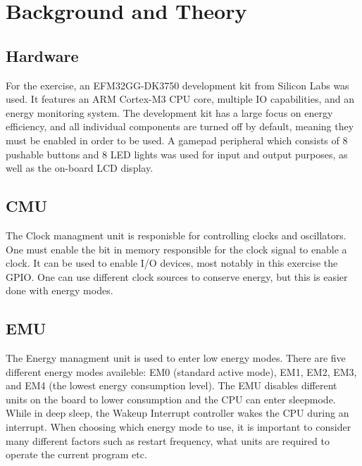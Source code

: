 \chapter{Background and Theory}


\section{Hardware}
For the exercise, an EFM32GG-DK3750 development kit from Silicon Labs was used. It features an ARM Cortex-M3 CPU core, multiple IO capabilities, and an energy monitoring system. The development kit has a large focus on energy efficiency, and all individual components are turned off by default, meaning they must be enabled in order to be used. A gamepad peripheral which consists of 8 pushable buttons and 8 LED lights was used for input and output purposes, as well as the on-board LCD display.

\section{CMU}
The Clock managment unit is responisble for controlling clocks and oscillators. One must enable the bit in memory responsible for the clock signal to enable a clock. It can be used to enable I/O devices, most notably in this exercise the GPIO. One can use different clock sources to conserve energy, but this is easier done with energy modes. 

\section{EMU}
The Energy managment unit is used to enter low energy modes. There are five different energy modes availeble: EM0 (standard active mode), EM1, EM2, EM3, and EM4 (the lowest energy consumption level). The EMU disables different units on the board to lower consumption and the CPU can enter sleepmode. While in deep sleep, the Wakeup Interrupt controller wakes the CPU during an interrupt. When choosing which energy mode to use, it is important to consider many different factors such as restart frequency, what units are required to operate the current program etc.

